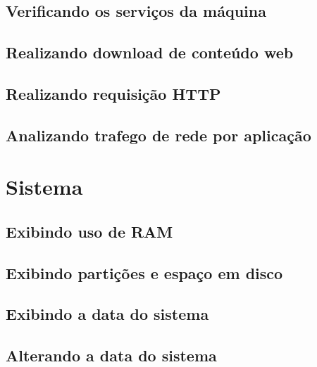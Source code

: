 \documentclass[a4paper,9pt]{extarticle}
\begin{document}
\begin{multicols}{2}
\subsection{Verificando os serviços da máquina}
	

\subsection{Realizando download de conteúdo web}
	 
	
\subsection{Realizando requisição HTTP}
\subsection{Analizando trafego de rede por aplicação}

\section{Sistema}
\subsection{Exibindo uso de RAM}
	
	
\subsection{Exibindo partições e espaço em disco}
	

\subsection{Exibindo a data do sistema}
	
	
\subsection{Alterando a data do sistema}
	
	

\end{multicols}
\end{document}
